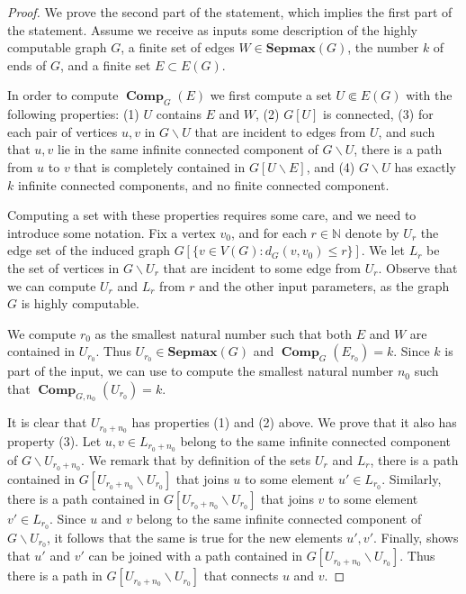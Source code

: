 \documentclass[10pt,a4paper]{amsart}
\newcommand{\N}{\mathbb{N}}
\newcommand{\comp}{\operatorname{\mathbf{Comp}}}
\newcommand{\sepmax}[1]{\mathbf{Sepmax}({#1})}
\renewcommand{\mid}{ : }
\begin{document}
\begin{proof}
    We prove the second part of the statement, which implies the first part of the statement. Assume we receive as inputs some description of the highly computable graph $G$, a finite set of edges $W \in \sepmax{G}$, the number $k$ of ends of $G$, and a finite set $E \subset E(G)$. 
    
    In order to compute $\comp_G(E)$ we first compute  a set $U\Subset E(G)$ with the following properties: (1) $U$ contains $E$ and $W$, (2) $G[U]$ is connected, (3) for each pair of vertices  $u,v$ in $G\smallsetminus U$ that are incident to edges from $U$, and such that $u,v$ lie in the same infinite connected component of $G\smallsetminus U$, there is a path from $u$ to $v$ that is completely contained in $G[U\smallsetminus E]$, and (4) $G\smallsetminus U$ has exactly $k$ infinite connected components, and no finite connected component.
    
    Computing a set with these properties requires some care, and we need to introduce some notation. Fix a vertex $v_0$, and for each $r\in\N$ denote by $U_r$ the edge set of the induced graph $G[\{v\in V(G)\mid d_G(v,v_0)\leq r\}]$. We let $L_r$ be the set of vertices in $G\smallsetminus U_r$ that are incident to some edge from $U_r$. Observe that we can compute $U_r$ and $L_r$ from $r$ and the other input parameters, as the graph $G$ is highly computable.    
    
    We  compute $r_0$ as the smallest natural number such that both $E$ and $W$ are contained in $U_{r_0}$.  Thus $U_{r_0}\in\sepmax{G}$ and $\comp_G(E_{r_0})=k$. Since  $k$ is part of the input, we can use  to  compute the smallest natural number $n_0$ such that $\comp_{G,n_0}(U_{r_0})=k$. 
    

    
    It is clear that $U_{r_0+n_0}$ has properties (1) and (2) above. We prove that it also has property (3). Let $u,v\in L_{r_0+n_0}$ belong to the same infinite connected component of $G\smallsetminus U_{r_0+n_0}$. We remark that by definition of the sets $U_r$ and $L_r$, there is a path contained in $G[U_{r_0+n_0}\smallsetminus U_{r_0}]$ that joins $u$ to some element $u'\in L_{r_0}$. Similarly, there is a path contained in $G[U_{r_0+n_0}\smallsetminus U_{r_0}]$ that joins $v$ to some element $v'\in L_{r_0}$. Since $u$ and $v$ belong to the same infinite connected component of $G\smallsetminus U_{r_0}$, it follows that the same is true for the new elements $u',v'$. Finally,  shows that $u'$ and $v'$ can be joined with a path contained in $G[U_{r_0+n_0}\smallsetminus U_{r_0}]$. Thus there is a path in $G[U_{r_0+n_0}\smallsetminus U_{r_0}]$ that connects $u$ and $v$. 
    

\end{proof}
\end{document}
